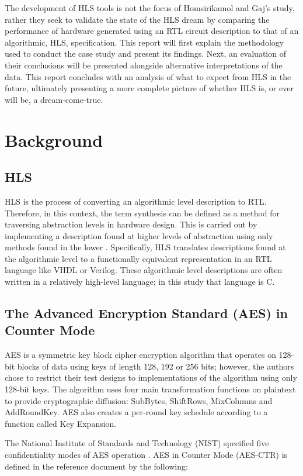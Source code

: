 \documentclass[12pt,journal,compsoc,onecolumn]{IEEEtran}
\begin{document}
The development of HLS tools is not the focus of Homsirikamol and Gaj's study, rather they seek to validate the state of the HLS dream by comparing the performance of hardware generated using an RTL circuit description to that of an algorithmic, HLS, specification. This report will first explain the methodology used to conduct the case study and present its findings. Next, an evaluation of their conclusions will be presented alongside alternative interpretations of the data. This report concludes with an analysis of what to expect from HLS in the future, ultimately presenting a more complete picture of whether HLS is, or ever will be, a dream-come-true.

\section{Background}
\subsection{HLS}\label{sec:hls}

HLS is the process of converting an algorithmic level description to RTL. Therefore, in this context, the term synthesis can be defined as a method for traversing abstraction levels in hardware design. This is carried out by implementing a description found at higher levels of abstraction using only methods found in the lower \cite{churtl}. Specifically, HLS translates descriptions found at the algorithmic level to a functionally equivalent representation in an RTL language like VHDL or Verilog. These algorithmic level descriptions are often written in a relatively high-level language; in this study that language is C. 

\subsection{The Advanced Encryption Standard (AES) in Counter Mode}

AES is a symmetric key block cipher encryption algorithm that operates on 128-bit blocks of data using keys of length 128, 192 or 256 bits; however, the authors chose to restrict their test designs to implementations of the algorithm using only 128-bit keys. The algorithm uses four main transformation functions on plaintext to provide cryptographic diffusion: SubBytes, ShiftRows, MixColumns and AddRoundKey. AES also creates a per-round key schedule according to a function called Key Expansion.

The National Institute of Standards and Technology (NIST) specified five confidentiality modes of AES operation \cite{14}. AES in Counter Mode (AES-CTR) is defined in the reference document by the following:
\end{document}
